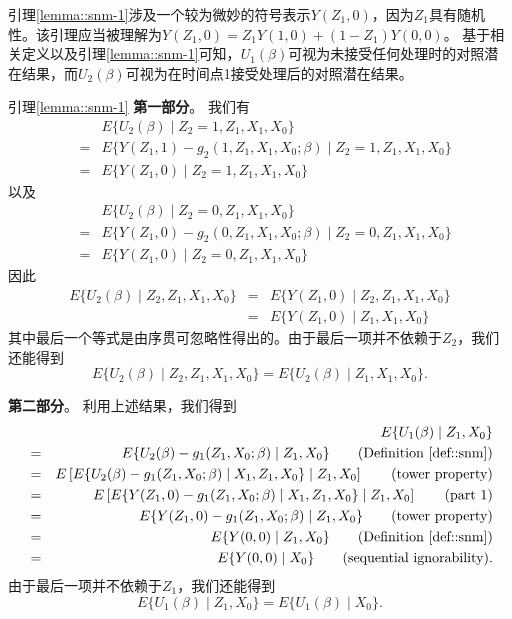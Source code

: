 引理\ref{lemma::snm-1}涉及一个较为微妙的符号表示$ Y(Z_1,0) $，因为$Z_1$具有随机性。该引理应当被理解为$  Y(Z_1,0) = Z_1 Y(1,0) +(1-Z_1) Y(0,0)$。
基于相关定义以及引理\ref{lemma::snm-1}可知，$U_1(\beta)$可视为未接受任何处理时的对照潜在结果，而$U_2(\beta)  $可视为在时间点1接受处理后的对照潜在结果。


\begin{myproof}{引理}{\ref{lemma::snm-1}}
{\bf 第一部分}。
我们有
\begin{eqnarray*}
&&E\{  U_2(\beta)  \mid Z_2=1, Z_1, X_1, X_0 \}  \\
&=&    E\{  Y(Z_1,1)- g_2(1, Z_1, X_1, X_0;\beta)   \mid Z_2=1, Z_1, X_1, X_0 \}  \\
&=& E\{  Y(Z_1,0)   \mid Z_2=1, Z_1, X_1, X_0 \} 
\end{eqnarray*}
以及
\begin{eqnarray*}
&&E\{  U_2(\beta)  \mid Z_2=0, Z_1, X_1, X_0 \} \\
 &=&    E\{  Y(Z_1,0)- g_2(0, Z_1, X_1, X_0;\beta)   \mid Z_2=0, Z_1, X_1, X_0 \}   \\
&=& E\{  Y(Z_1,0)   \mid Z_2=0, Z_1, X_1, X_0 \}
\end{eqnarray*}
因此
\begin{eqnarray*}
E\{  U_2(\beta)  \mid Z_2, Z_1, X_1, X_0 \}  &=&  E\{  Y(Z_1,0)   \mid Z_2, Z_1, X_1, X_0 \} \\
&=& E\{  Y(Z_1,0)   \mid   Z_1, X_1, X_0 \}
\end{eqnarray*}
其中最后一个等式是由序贯可忽略性得出的。由于最后一项并不依赖于$Z_2$，我们还能得到
$$
E\{  U_2(\beta)  \mid Z_2, Z_1, X_1, X_0 \}  = E\{  U_2(\beta)  \mid  Z_1, X_1, X_0 \} . 
$$

{\bf 第二部分}。
利用上述结果，我们得到
\begin{eqnarray*}
&&E\{  U_1(\beta)  \mid  Z_1, X_0 \}  \\
&=&  E\{  U_2(\beta)  - g_1( Z_1, X_0;\beta)  \mid  Z_1, X_0 \} \qquad (\text{Definition } \ref{def::snm}) \\
&=& E\left[    E\{  U_2(\beta)  - g_1( Z_1, X_0;\beta)  \mid X_1,  Z_1, X_0 \}   \mid  Z_1, X_0 \right]  \qquad (\text{tower property})  \\
&=&  E\left[    E\{ Y(Z_1,0) - g_1( Z_1, X_0;\beta)  \mid X_1,  Z_1, X_0 \}   \mid  Z_1, X_0 \right]   \qquad (\text{part 1}) \\
&=&  E\{ Y(Z_1,0) - g_1( Z_1, X_0;\beta)  \mid  Z_1, X_0 \} \qquad (\text{tower property})  \\
&=& E\{ Y(0,0)  \mid  Z_1, X_0 \} \qquad (\text{Definition } \ref{def::snm}) \\
&=&  E\{ Y(0,0)  \mid  X_0 \}  \qquad (\text{sequential ignorability}).
\end{eqnarray*}
由于最后一项并不依赖于$Z_1$，我们还能得到
$$
E\{  U_1(\beta)  \mid  Z_1, X_0 \}   = E\{  U_1(\beta)  \mid   X_0 \}.   
$$
\end{myproof}


